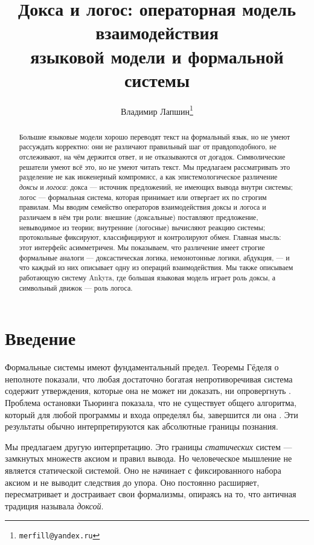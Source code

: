 \documentclass[12pt,a4paper]{article}
\title{Докса и логос: операторная модель взаимодействия\\
языковой модели и формальной системы}
\author{Владимир Лапшин\thanks{\texttt{merfill@yandex.ru}}}
\date{}
\begin{document}
\maketitle

\begin{abstract}
Большие языковые модели хорошо переводят текст на формальный язык, но не умеют
рассуждать корректно: они не различают правильный шаг от правдоподобного, не
отслеживают, на чём держится ответ, и не отказываются от догадок. Символические
решатели умеют всё это, но не умеют читать текст. Мы предлагаем рассматривать это
разделение не как инженерный компромисс, а как эпистемологическое различение
\emph{доксы} и \emph{логоса}: докса --- источник предложений, не имеющих вывода
внутри системы; логос --- формальная система, которая принимает или отвергает их
по строгим правилам. Мы вводим семейство операторов взаимодействия доксы и логоса
и различаем в нём три роли: внешние (доксальные) поставляют предложение, невыводимое
из теории; внутренние (логосные) вычисляют реакцию системы; протокольные фиксируют,
классифицируют и контролируют обмен. Главная мысль: этот интерфейс асимметричен.
Мы показываем, что различение имеет строгие формальные аналоги --- доксастическая
логика, немонотонные логики, абдукция, --- и что каждый из них описывает одну из
операций взаимодействия. Мы также описываем работающую систему Ankyra, где большая
языковая модель играет роль доксы, а символьный движок --- роль логоса.
\end{abstract}

\section{Введение}
\label{sec:intro}

Формальные системы имеют фундаментальный предел. Теоремы Гёделя о неполноте показали, что любая достаточно богатая непротиворечивая
система содержит утверждения, которые она не может ни доказать, ни опровергнуть \cite{godel}. Проблема остановки Тьюринга показала, что не
существует общего алгоритма, который для любой программы и входа определял бы, завершится ли она \cite{turing36}. Эти результаты обычно
интерпретируются как абсолютные границы познания.

Мы предлагаем другую интерпретацию. Это границы \emph{статических} систем --- замкнутых множеств аксиом и правил вывода.
Но человеческое мышление не является статической системой. Оно не начинает с фиксированного набора аксиом и не выводит следствия
до упора. Оно постоянно расширяет, пересматривает и достраивает свои формализмы, опираясь на то, что античная традиция называла
\emph{доксой}.
\end{document}
